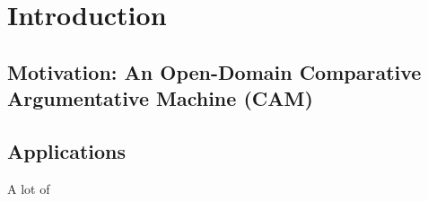 \chapter{Introduction}

\section{Motivation: An Open-Domain Comparative Argumentative Machine (CAM)}

%
%
%



\section{Applications}
\label{sec:applications}
A lot of


